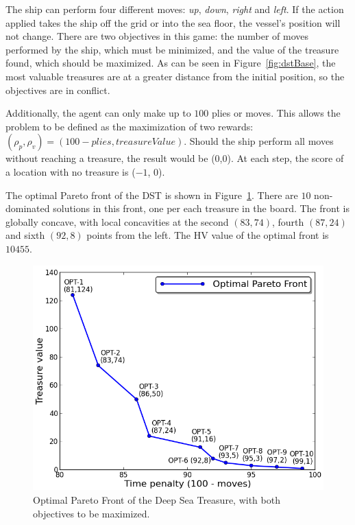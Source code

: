 \documentclass[journal]{IEEEtran}
\begin{document}
The ship can perform four different moves: \textit{up}, \textit{down}, \textit{right}  and \textit{left}. If the action applied takes the ship off the grid or into the sea floor, the vessel's position will not change.  There are two objectives in this game: the number of moves performed by the ship, which must be minimized, and the value of the treasure found, which should be maximized. As can be seen in Figure~\ref{fig:dstBase}, the most valuable treasures are at a greater distance from the initial position, so the objectives are in conflict.

Additionally, the agent can only make up to $100$ plies or moves. This allows the problem to be defined as the maximization of two rewards: $(\rho_p,\rho_v) = (100 - plies, treasureValue)$. Should the ship perform all moves without reaching a treasure, the result would be ($0$,$0$). At each step, the score of a location with no treasure is ($-1$, $0$).

The optimal Pareto front of the DST is shown in Figure~\ref{fig:optDst}. There are $10$ non-dominated solutions in this front, one per each treasure in the board. The front is globally concave, with local concavities at the second $(83,74)$, fourth $(87,24)$ and sixth $(92,8)$ points from the left. The HV value of the optimal front is $10455$.

\begin{figure}[!t]
\begin{center}
\includegraphics[width=1.0\columnwidth]{figures/perez6}
\end{center}
\caption{Optimal Pareto Front of the Deep Sea Treasure, with both objectives to be maximized.}
\label{fig:optDst}
\end{figure}
\end{document}
